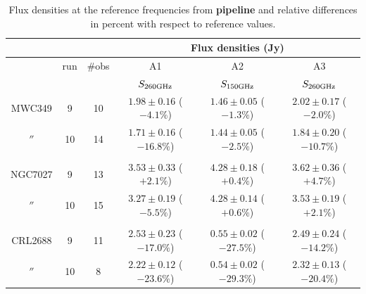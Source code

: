 \begin{table}[bh]
\begin{center}
\begin{tabular}{|c|c|c|c|c|c|}
\hline
\multicolumn{3}{|c}{}  & \multicolumn{3}{|c|}{Flux  densities (Jy)}   \\
\hline
         & run  & \#obs &  A1                        &  A2                        &           A3                  \\
         &      &       &  $S_{260 {\rm GHz}}$       &  $S_{150 {\rm GHz}}$       & $S_{260 {\rm GHz}}$         \\
\hline  
MWC349   &  9   & 10    &  $1.98\pm0.16$ ($-4.1\%$)  &  $1.46\pm0.05$ ($-1.3\%$)  &  $2.02\pm0.17$ ($-2.0\%$)     \\
  $''$   & 10   & 14    &  $1.71\pm0.16$ ($-16.8\%$) & $1.44\pm0.05$ ($-2.5\%$)   &  $1.84\pm0.20$ ($-10.7\%$)      \\
         &      &       &                            &                            &                              \\
NGC7027  &  9   & 13    &  $3.53\pm0.33$ ($+2.1\%$)  &  $4.28\pm0.18$ ($+0.4\%$)  & $3.62\pm0.36$ ($+4.7\%$)      \\
  $''$   & 10   & 15    &  $3.27\pm0.19$ ($-5.5\%$)  & $4.28\pm0.14$ ($+0.6\%$)   &  $3.53\pm0.19$ ($+2.1\%$)        \\
         &      &       &                            &                            &                                \\
CRL2688  &  9   & 11    &  $2.53\pm0.23$ ($-17.0\%$) &  $0.55\pm0.02$ ($-27.5\%$) &  $2.49\pm0.24$ ($-14.2\%$)    \\
  $''$   & 10   &  8    &  $2.22\pm0.12$ ($-23.6\%$) &  $0.54\pm0.02$ ($-29.3\%$) &  $2.32\pm0.13$ ($-20.4\%$)     \\
\hline
\end{tabular}
\caption{Flux densities at the reference frequencies  from {\bf pipeline} and relative differences in percent with respect to reference values.}
\label{tab:flux_sec_NK}
\end{center}
\end{table}

